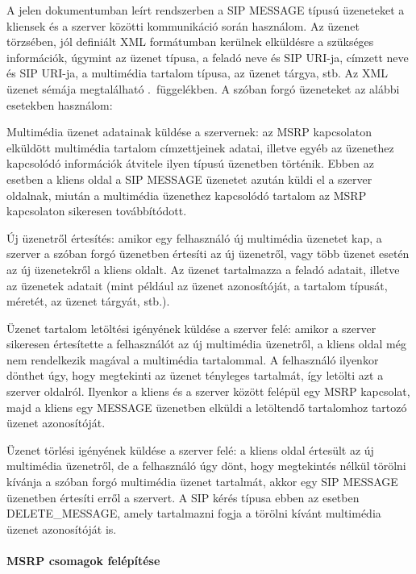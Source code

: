 A jelen dokumentumban leírt rendszerben a SIP MESSAGE típusú üzeneteket a kliensek és a szerver közötti kommunikáció során használom. Az üzenet törzsében, jól definiált XML formátumban kerülnek elküldésre a szükséges információk, úgymint az üzenet típusa, a feladó neve és SIP URI-ja, címzett neve és SIP URI-ja, a multimédia tartalom típusa, az üzenet tárgya, stb. Az XML üzenet sémája megtalálható .~függelékben. A szóban forgó üzeneteket az alábbi esetekben használom:
\begin{mydescription}
\item[Multimédia üzenet adatainak küldése a szervernek:] az MSRP kapcsolaton elküldött multimédia tartalom címzettjeinek adatai, illetve egyéb az üzenethez kapcsolódó információk átvitele ilyen típusú üzenetben történik. Ebben az esetben a kliens oldal a SIP MESSAGE üzenetet azután küldi el a szerver oldalnak, miután a multimédia üzenethez kapcsolódó tartalom az MSRP kapcsolaton sikeresen továbbítódott.
\item[Új üzenetről értesítés:] amikor egy felhasználó új multimédia üzenetet kap, a szerver a szóban forgó üzenetben értesíti az új üzenetről, vagy több üzenet esetén az új üzenetekről a kliens oldalt. Az üzenet tartalmazza a feladó adatait, illetve az üzenetek adatait (mint például az üzenet azonosítóját, a tartalom típusát, méretét, az üzenet tárgyát, stb.).
\item[Üzenet tartalom letöltési igényének küldése a szerver felé:] amikor a szerver sikeresen értesítette a felhasználót az új multimédia üzenetről, a kliens oldal még nem rendelkezik magával a multimédia tartalommal. A felhasználó ilyenkor dönthet úgy, hogy megtekinti az üzenet tényleges tartalmát, így letölti azt a szerver oldalról. Ilyenkor a kliens és a szerver között felépül egy MSRP kapcsolat, majd a kliens egy MESSAGE üzenetben elküldi a letöltendő tartalomhoz tartozó üzenet azonosítóját.
\item[Üzenet törlési igényének küldése a szerver felé:] a kliens oldal értesült az új multimédia üzenetről, de a felhasználó úgy dönt, hogy megtekintés nélkül törölni kívánja a szóban forgó multimédia üzenet tartalmát, akkor egy SIP MESSAGE üzenetben értesíti erről a szervert. A SIP kérés típusa ebben az esetben DELETE\_MESSAGE, amely tartalmazni fogja a törölni kívánt multimédia üzenet azonosítóját is.

\end{mydescription}

\paragraph{MSRP csomagok felépítése\\}
\label{sec:msrp_chunks}

